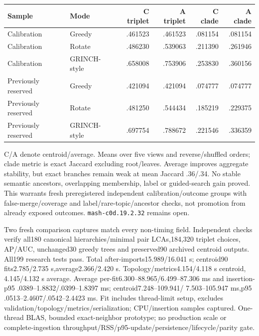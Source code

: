 \documentclass[11pt]{article}
\begin{document}
\begin{center}
\small
\begin{tabular}{llrrrr}
\toprule
Sample & Mode & C triplet & A triplet & C clade & A clade \\
\midrule
Calibration & Greedy & .461523 & .461523 & .081154 & .081154 \\
Calibration & Rotate & .486230 & .539063 & .211390 & .261946 \\
Calibration & GRINCH-style & .658008 & .753906 & .253830 & .360156 \\
Previously reserved & Greedy & .421094 & .421094 & .074777 & .074777 \\
Previously reserved & Rotate & .481250 & .544434 & .185219 & .229375 \\
Previously reserved & GRINCH-style & .697754 & .788672 & .221546 & .336359 \\
\bottomrule
\end{tabular}
\end{center}
C/A denote centroid/average. Means over five views and reverse/shuffled orders;
clade metric is exact Jaccard excluding root/leaves. Average improves aggregate
stability, but exact branches remain weak at mean Jaccard .36/.34. No stable
semantic ancestors, overlapping membership, label or guided-search gain proved.
This warrants fresh preregistered independent calibration/outcome groups with
false-merge/coverage and label/rare-topic/ancestor checks, not promotion from
already exposed outcomes. \texttt{mash-c0d.19.2.32} remains open.

Two fresh comparison captures match every non-timing field. Independent checks
verify all180 canonical hierarchies/minimal pair LCAs,184,320 triplet choices,
AP/AUC, unchanged30 greedy trees and preserved90 archived centroid outputs.
All199 research tests pass. Total after-imports15.989/16.041 s; centroid90
fits2.785/2.735 s,average2.366/2.420 s. Topology/metrics4.154/4.118 s centroid,
4.145/4.132 s average. Average per-fit6.300--88.965/6.499--87.306 ms and
insertion-p95 .0389--1.8832/.0399--1.8397 ms; centroid7.248--109.941/
7.503--105.947 ms,p95 .0513--2.4607/.0542--2.4423 ms. Fit includes thread-limit
setup, excludes validation/topology/metrics/serialization; CPU/insertion samples
captured. One-thread BLAS, bounded exact-neighbor prototype; no production scale
or complete-ingestion throughput/RSS/p95-update/persistence/lifecycle/parity gate.
\end{document}
